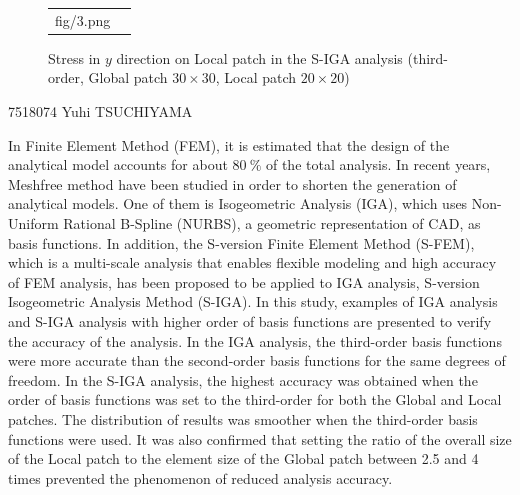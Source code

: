 \documentclass[12pt,a4j,fleqn]{jsarticle}
\begin{document}
\begin{figure}[hbtp]
\begin{tabular}{cc}
\begin{minipage}[t]{0.45\hsize}
      {fig/3.png}
      \caption{Stress in $y$ direction on Local patch in the S-IGA analysis (third-order, Global patch $30\times 30$, Local patch $20\times 20$)}
      \label{fig:3}
    \end{minipage}
  \end{tabular}
\end{figure}

\clearpage
\begin{center}
\textsf{}
\end{center}
\vspace{\baselineskip}
\begin{flushleft}
\end{flushleft}
\vspace{-2\baselineskip}
\begin{flushright}
7518074 Yuhi TSUCHIYAMA
\end{flushright}
In Finite Element Method (FEM), it is estimated that
the design of the analytical model accounts for about $80\ \%$ of the total analysis.
%
In recent years, Meshfree method have been studied in order to shorten the generation of analytical models.
%
One of them is Isogeometric Analysis (IGA),
which uses Non-Uniform Rational B-Spline (NURBS),
a geometric representation of CAD,
as basis functions.
%
In addition, the S-version Finite Element Method (S-FEM),
which is a multi-scale analysis that enables flexible modeling and high accuracy of FEM analysis,
has been proposed to be applied to IGA analysis, S-version Isogeometric Analysis Method (S-IGA).
%
In this study, examples of IGA analysis and S-IGA analysis
with higher order of basis functions are presented to verify the accuracy of the analysis.
%
In the IGA analysis,
the third-order basis functions were more accurate than the second-order basis functions for the same degrees of freedom.
%
In the S-IGA analysis, the highest accuracy was obtained when the order of basis functions was set to the third-order for both the Global and Local patches.
%
The distribution of results was smoother when the third-order basis functions were used.
%
It was also confirmed that setting the ratio of the overall size of the Local patch to the element size of the Global patch
between 2.5 and 4 times prevented the phenomenon of reduced analysis accuracy.
\end{document}
